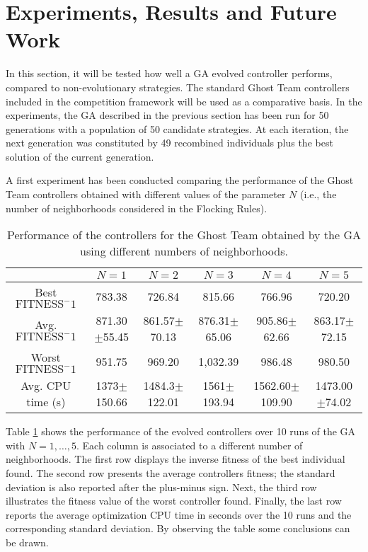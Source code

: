 \documentclass[a4paper]{llncs}
\begin{document}
%
%

\section{Experiments, Results and Future Work}
\label{sec:experiments}

In this section, it will be tested how well a GA evolved controller performs, compared to non-evolutionary strategies. The standard Ghost Team controllers included in the competition framework will be used as a comparative basis.  
In the experiments, the GA described in the previous section has been
run for 50 generations with a population of 50 candidate strategies. At each iteration, the next generation was constituted by 49 recombined individuals plus the best solution of the current generation. 

A first experiment has been conducted comparing the performance of the Ghost Team controllers obtained with different values of the parameter $N$ (i.e., the number of neighborhoods considered in the Flocking Rules). 

\begin{table} [htbp]
\centering
{
\begin{scriptsize}
\begin{tabular}{|c||c|c|c|c|c|}
\hline & $N = 1$ & $N = 2$ & $N = 3$ & $N = 4$ & $N = 5$ \\
\hline
Best $\mathrm{FITNESS}^-1$& 783.38 & 726.84 & 815.66 & 766.96 & 720.20 \\
\hline
Avg. $\mathrm{FITNESS}^-1$& 871.30$\pm$55.45 & 861.57$\pm$70.13 & 876.31$\pm$65.06 & 905.86$\pm$62.66 & 863.17$\pm$72.15 \\
\hline
Worst $\mathrm{FITNESS}^-1$ & 951.75 & 969.20 & 1,032.39 & 986.48 & 980.50 \\
\hline
Avg. CPU time (s)& 1373$\pm$150.66 & 1484.3$\pm$122.01 & 1561$\pm$193.94 & 1562.60$\pm$109.90 & 1473.00$\pm$74.02 \\
\hline
\end{tabular}
\end{scriptsize}
}
\caption{Performance of the controllers for the Ghost Team obtained by the GA using different numbers of neighborhoods.
\label{tab:results_GA}}
\end{table}


Table \ref{tab:results_GA} shows the performance of the evolved controllers over 10 runs of the GA with $N=1,\ldots,5$. Each column is associated to a different number of neighborhoods. The first row displays the inverse fitness of the best individual found. The second row presents the average controllers fitness; the standard deviation is also reported after the plus-minus sign. Next, the third row illustrates the fitness value of the worst controller found. Finally, the last row reports the average optimization CPU time in seconds over the 10 runs and the corresponding standard deviation. By observing the table some conclusions can be drawn.
\end{document}
